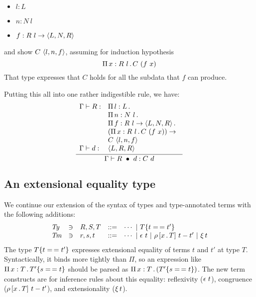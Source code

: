 \documentclass{article}
\begin{document}
\begin{itemize}
\item $l : L$
\item $n : N\ l$
\item $f:R\ l \to \w{L}{N}{R}$
\end{itemize}

\noindent and show $C\ \ctor{l}{n}{f}$, assuming for induction hypothesis
\[
\Pia{x}{R\ l}{C\ (f\ x)}
\]
\noindent That type expresses that $C$ holds for all the subdata that $f$ can produce.

Putting this all into one rather indigestible rule, we have:
\[
\infer{\Gamma \vdash \wrec{R}{d} : C\ d}
      {
        \begin{array}{lll}
\Gamma \vdash R : & \Pia{l}{L}{\ }  \\
\ &  \Pia{n}{N\ l}{\ }  \\
\ &  \Pia{f}{R\ l \to \w{L}{N}{R}}{\ }  \\
\ &  (\Pia{x}{R\ l}{C\ (f\ x)}) \to  \\
\ &  C\ \ctor{l}{n}{f} \\
\Gamma\vdash d : & \w{L}{R}{R}
        \end{array} }
      \]



\subsection{An extensional equality type}

We continue our extension of the syntax of types and type-annotated terms with the following additions:
\[
\begin{array}{lllll}
  \textit{Ty} & \ni & R,S,T & ::= & \cdots\ |\ \eqtm{t}{T}{t'} \\
  \textit{Tm} & \ni & r,s,t & ::= & \cdots\ |\ \rfl{t}\ |\ \cng{x}{T}{t}{t'}\ |\ \ext{t}
\end{array}
\]
\noindent The type $\eqtm{t}{T}{t'}$ expresses extensional equality of
terms $t$ and $t'$ at type $T$.  Syntactically, it binds more tightly
than $\Pi$, so an expression like $\Pia{x}{T}{\eqtm{s}{T'}{t}}$ should
be parsed as $\Pia{x}{T}{(\eqtm{s}{T'}{t})}$.  The new term constructs
are for inference rules about this equality: reflexivity ($\rfl{t}$),
congruence ($\cng{x}{T}{t}{t'}$), and extensionality ($\ext{t}$).  
\end{document}
